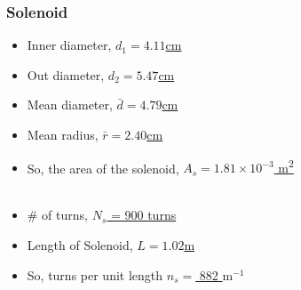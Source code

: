 \documentclass[twocolumn,english]{IEEEtran}
\theoremstyle{plain}
\theoremstyle{plain}
\begin{document}
\subsubsection{Solenoid}
\begin{itemize}
\item Inner diameter, \hfill\underline{$d_1 = 4.11$cm}

\item Out diameter, \hfill\underline{$d_2 = 5.47$cm}

\item Mean diameter, \hfill\underline{$\bar{d} = 4.79$cm}

\item Mean radius, \hfill\underline{$\bar{r} = 2.40$cm}

\item So, the area of the solenoid, \hfill\underline{$A_s = 1.81 \times 10^{-3}$ m\textsuperscript{2}}\\ \\

\item \# of turns, \hfill\underline{ $N_s$ = 900 turns}

\item Length of Solenoid, \hfill \underline{$L = 1.02$m}

\item So, turns per unit length \hfill\underline{$n_s = $ 882 $\text{m}^{-1}$} \\

\end{itemize}
\end{document}
